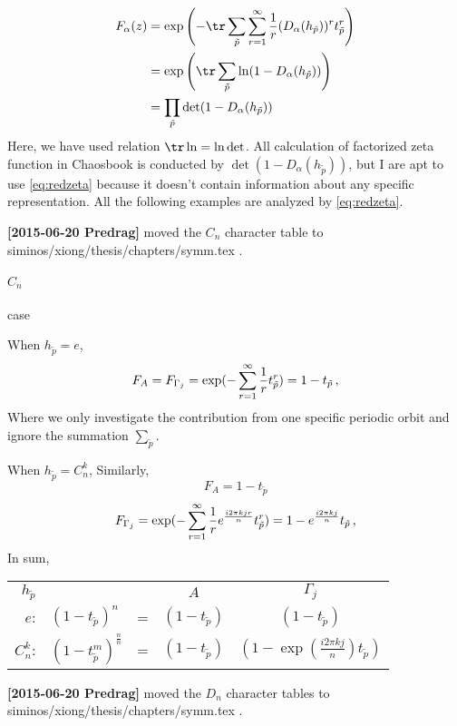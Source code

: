 \begin{description}
\begin{align*}
F_\alpha (z) & =
{\rm exp}  \left( -
  \tr \sum_{\tilde{p}} \sum_{r=1}^\infty {1 \over r}
 (D_{\alpha}(h_{\tilde{p}}))^{r} t_{\tilde{p}}^{r} \right) \\
& ={\rm exp}  \left(
  \tr \sum_{\tilde{p}} \ln (1-D_{\alpha}(h_{\tilde{p}}))
  \right) \\
& = \prod_{\tilde{p}} \det(1-D_{\alpha}(h_{\tilde{p}}))
\end{align*}
Here, we have used relation $\tr \ln= \ln \det$. All calculation of
factorized zeta function in Chaosbook is conducted by
$\det(1-D_{\alpha}(h_{\tilde{p}}))$, but I are apt to use \eqref{eq:redzeta}
because it doesn't contain information about any specific representation.
All the following examples are analyzed by \eqref{eq:redzeta}.

{\bf [2015-06-20 Predrag]} moved the $C_{n}$ character table to
siminos/xiong/thesis/chapters/symm.tex .

\paragraph{$C_{n}$} case

When $h_{\tilde p}=e$,
\[
F_{A}=F_{\Gamma_j}={\rm exp} (-\sum_{r=1}^\infty {1 \over r}t_{\tilde{p}}^{r} )
=1-t_{\tilde p}
\,,
\]
Where we only investigate the contribution from one specific periodic
orbit and ignore the summation $ \sum_{\tilde{p}}$.

When $h_{\tilde p}=C_n^k$, Similarly,
\[
F_{A}=1-t_{\tilde p}
\]
\[
F_{\Gamma_j}={\rm exp} (-\sum_{r=1}^\infty {1 \over r}e^{\frac{i2\pi kjr}{n}}
t_{\tilde{p}}^{r} )
=1-e^{\frac{i2\pi kj}{n}} t_{\tilde p}
\,,
\]
In sum,
\vskip 12pt
\begin{tabular}{rlccc}

$h_{\tilde p}$ &  & &  $A$  &  $\Gamma_{j}$ \\
$e$:
& $(1-t_{\tilde p} )^n$  &=&$(1-t_{\tilde p})$ & $(1-t_{\tilde p})$  \\
$C_n^{k}$:
& $(1-t_{\tilde p}^m )^{\frac{n}{n}}$ &=&  $(1-t_{\tilde p})$ & $(1-\exp(\frac{i2\pi kj}{n})t_{\tilde p})$ \\
\end{tabular}
\vskip 12pt
\noindent

{\bf [2015-06-20 Predrag]} moved the $D_{n}$ character tables to
siminos/xiong/thesis/chapters/symm.tex .


\end{description}
